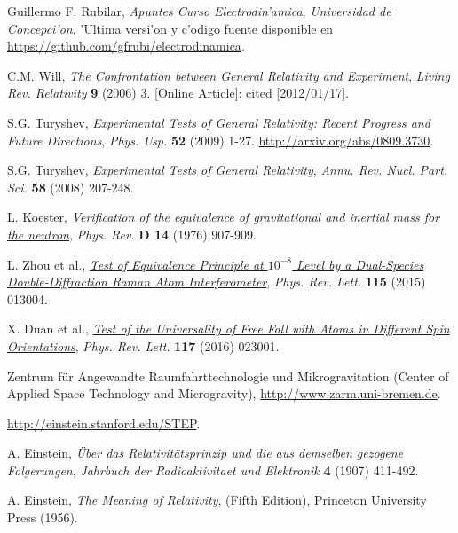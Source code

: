 \begin{thebibliography}{99}


Guillermo F. Rubilar, {\it Apuntes Curso Electrodin'amica}, {\sl
Universidad de Concepci'on}. 'Ultima versi'on y c'odigo fuente disponible en \url{https://github.com/gfrubi/electrodinamica}.

 C.M. Will, \href{http://www.livingreviews.org/lrr-2006-3}{\em The Confrontation between General Relativity and Experiment}, {\sl Living Rev. Relativity} {\bf 9} (2006) 3. [Online Article]: cited [2012/01/17].

 S.G. Turyshev, {\em Experimental Tests of General Relativity: Recent Progress and Future Directions}, {\sl Phys. Usp.} {\bf 52} (2009) 1-27. \url{http://arxiv.org/abs/0809.3730}.

 S.G. Turyshev, \href{http://www.annualreviews.org/doi/abs/10.1146/annurev.nucl.58.020807.111839}{\em Experimental Tests of General Relativity}, {\sl Annu. Rev. Nucl. Part. Sci.} {\bf 58} (2008) 207-248. 

 L. Koester, \href{http://dx.doi.org/10.1103/PhysRevD.14.907}{\em Verification of the equivalence of gravitational and inertial mass for the neutron}, {\sl Phys. Rev.} {\bf D 14} (1976) 907-909.

 L. Zhou et al., \href{http://dx.doi.org/10.1103/PhysRevLett.115.013004}{\em Test of Equivalence Principle at $10^{-8}$ Level by a Dual-Species Double-Diffraction Raman
Atom Interferometer}, {\sl Phys. Rev. Lett.} {\bf 115} (2015) 013004.

 X. Duan et al., \href{http://dx.doi.org/10.1103/PhysRevLett.117.023001}{\em Test of the Universality of Free Fall with Atoms in Different Spin Orientations}, {\sl Phys. Rev. Lett.} {\bf 117} (2016) 023001. 

 Zentrum f\"ur Angewandte Raumfahrttechnologie und Mikrogravitation (Center of Applied Space Technology and Microgravity), \url{http://www.zarm.uni-bremen.de}.

 \url{http://einstein.stanford.edu/STEP}.

 A. Einstein, {\it \"Uber das Relativit\"atsprinzip und die aus demselben gezogene Folgerungen}, {\sl Jahrbuch der Radioaktivitaet und Elektronik} {\bf 4} (1907) 411-492.

 A. Einstein, \emph{The Meaning of Relativity}, (Fifth
Edition), Princeton University Press (1956).


\end{thebibliography}
